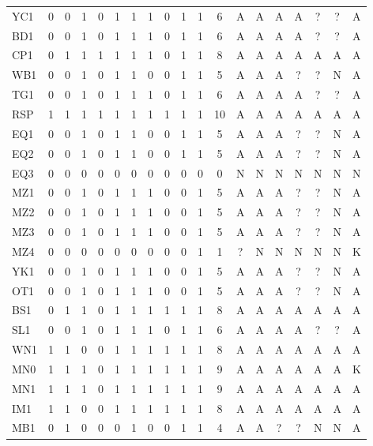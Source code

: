 {\begin{longtable}{@{}lcccccccccccccccccc@{}}
YC1 & 0 & 0 & 1 & 0 & 1 & 1 & 1 & 0 & 1 & 1 & 6 & A & A & A & A & ? & ? & A \\
BD1 & 0 & 0 & 1 & 0 & 1 & 1 & 1 & 0 & 1 & 1 & 6 & A & A & A & A & ? & ? & A \\
CP1 & 0 & 1 & 1 & 1 & 1 & 1 & 1 & 0 & 1 & 1 & 8 & A & A & A & A & A & A & A \\
WB1 & 0 & 0 & 1 & 0 & 1 & 1 & 0 & 0 & 1 & 1 & 5 & A & A & A & ? & ? & N & A \\
TG1 & 0 & 0 & 1 & 0 & 1 & 1 & 1 & 0 & 1 & 1 & 6 & A & A & A & A & ? & ? & A \\
RSP & 1 & 1 & 1 & 1 & 1 & 1 & 1 & 1 & 1 & 1 & 10 & A & A & A & A & A & A & A \\
EQ1 & 0 & 0 & 1 & 0 & 1 & 1 & 0 & 0 & 1 & 1 & 5 & A & A & A & ? & ? & N & A \\
EQ2 & 0 & 0 & 1 & 0 & 1 & 1 & 0 & 0 & 1 & 1 & 5 & A & A & A & ? & ? & N & A \\
EQ3 & 0 & 0 & 0 & 0 & 0 & 0 & 0 & 0 & 0 & 0 & 0 & N & N & N & N & N & N & N \\
MZ1 & 0 & 0 & 1 & 0 & 1 & 1 & 1 & 0 & 0 & 1 & 5 & A & A & A & ? & ? & N & A \\
MZ2 & 0 & 0 & 1 & 0 & 1 & 1 & 1 & 0 & 0 & 1 & 5 & A & A & A & ? & ? & N & A \\
MZ3 & 0 & 0 & 1 & 0 & 1 & 1 & 1 & 0 & 0 & 1 & 5 & A & A & A & ? & ? & N & A \\
MZ4 & 0 & 0 & 0 & 0 & 0 & 0 & 0 & 0 & 0 & 1 & 1 & ? & N & N & N & N & N & K \\
YK1 & 0 & 0 & 1 & 0 & 1 & 1 & 1 & 0 & 0 & 1 & 5 & A & A & A & ? & ? & N & A \\
OT1 & 0 & 0 & 1 & 0 & 1 & 1 & 1 & 0 & 0 & 1 & 5 & A & A & A & ? & ? & N & A \\
BS1 & 0 & 1 & 1 & 0 & 1 & 1 & 1 & 1 & 1 & 1 & 8 & A & A & A & A & A & A & A \\
SL1 & 0 & 0 & 1 & 0 & 1 & 1 & 1 & 0 & 1 & 1 & 6 & A & A & A & A & ? & ? & A \\
WN1 & 1 & 1 & 0 & 0 & 1 & 1 & 1 & 1 & 1 & 1 & 8 & A & A & A & A & A & A & A \\
MN0 & 1 & 1 & 1 & 0 & 1 & 1 & 1 & 1 & 1 & 1 & 9 & A & A & A & A & A & A & K \\
MN1 & 1 & 1 & 1 & 0 & 1 & 1 & 1 & 1 & 1 & 1 & 9 & A & A & A & A & A & A & A \\
IM1 & 1 & 1 & 0 & 0 & 1 & 1 & 1 & 1 & 1 & 1 & 8 & A & A & A & A & A & A & A \\
MB1 & 0 & 1 & 0 & 0 & 0 & 1 & 0 & 0 & 1 & 1 & 4 & A & A & ? & ? & N & N & A \\

\end{longtable}}
